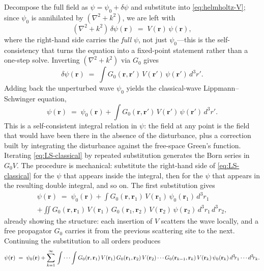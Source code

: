 \documentclass[11pt]{article}
\begin{document}
Decompose the full field as $\psi = \psi_0 + \delta\psi$ and substitute
into \eqref{eq:helmholtz-V}; since $\psi_0$ is annihilated by
$(\nabla^2 + k^2)$, we are left with
\begin{equation}
(\nabla^2 + k^2)\,\delta\psi(\mathbf{r}) \;=\; V(\mathbf{r})\,\psi(\mathbf{r}),
\label{eq:helmholtz-deltapsi}
\end{equation}
where the right-hand side carries the \emph{full} $\psi$, not just
$\psi_0$---this is the self-consistency that turns the equation into a
fixed-point statement rather than a one-step solve.  Inverting
$(\nabla^2 + k^2)$ via $G_0$ gives
\begin{equation}
\delta\psi(\mathbf{r}) \;=\; \int G_0(\mathbf{r}, \mathbf{r}')\,
V(\mathbf{r}')\,\psi(\mathbf{r}')\,d^3\!r' .
\label{eq:deltapsi-integral}
\end{equation}
Adding back the unperturbed wave $\psi_0$ yields the classical-wave
Lippmann--Schwinger equation,
\begin{equation}
\boxed{\;\psi(\mathbf{r}) \;=\; \psi_0(\mathbf{r}) +
\int G_0(\mathbf{r}, \mathbf{r}')\,V(\mathbf{r}')\,\psi(\mathbf{r}')\,
d^3\!r' .\;}
\label{eq:LS-classical}
\end{equation}
This is a self-consistent integral relation in $\psi$: the field at
any point is the field that would have been there in the absence of
the disturbance, plus a correction built by integrating the
disturbance against the free-space Green's function.  Iterating
\eqref{eq:LS-classical} by repeated substitution generates the Born
series in $G_0 V$.  The procedure is mechanical: substitute the
right-hand side of \eqref{eq:LS-classical} for the $\psi$ that appears
inside the integral, then for the $\psi$ that appears in the resulting
double integral, and so on.  The first substitution gives
\begin{multline}
\psi(\mathbf{r}) \;=\; \psi_0(\mathbf{r})
  + \int G_0(\mathbf{r}, \mathbf{r}_1)\,V(\mathbf{r}_1)\,\psi_0(\mathbf{r}_1)\,d^3\!r_1 \\
  + \iint G_0(\mathbf{r}, \mathbf{r}_1)\,V(\mathbf{r}_1)\,
          G_0(\mathbf{r}_1, \mathbf{r}_2)\,V(\mathbf{r}_2)\,\psi(\mathbf{r}_2)\,
          d^3\!r_1\,d^3\!r_2 ,
\end{multline}
already showing the structure: each insertion of $V$ scatters the wave
locally, and a free propagator $G_0$ carries it from the previous
scattering site to the next.  Continuing the substitution to all
orders produces
\begin{equation}
\psi(\mathbf{r}) \;=\; \psi_0(\mathbf{r}) +
\sum_{k=1}^{\infty}\,
\idotsint
G_0(\mathbf{r}, \mathbf{r}_1)\,V(\mathbf{r}_1)\,
G_0(\mathbf{r}_1, \mathbf{r}_2)\,V(\mathbf{r}_2)\cdots
G_0(\mathbf{r}_{k-1}, \mathbf{r}_k)\,V(\mathbf{r}_k)\,\psi_0(\mathbf{r}_k)\,
d^3\!r_1\cdots d^3\!r_k .
\label{eq:born-classical-explicit}
\end{equation}
\end{document}
